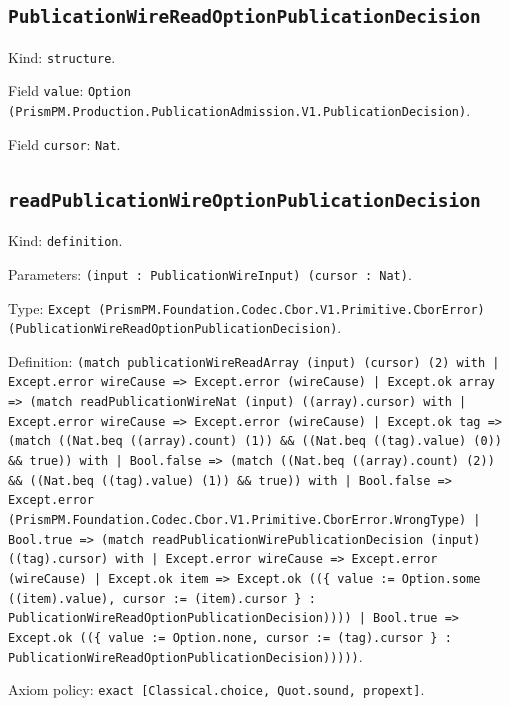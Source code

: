 \documentclass[11pt]{article}
\begin{document}
\subsection*{\texttt{PublicationWireReadOptionPublicationDecision}}
\noindent Kind: \texttt{structure}.\par
\noindent Field \texttt{value}: \texttt{Option (PrismPM.Production.PublicationAdmission.V1.PublicationDecision)}.\par
\noindent Field \texttt{cursor}: \texttt{Nat}.\par
\subsection*{\texttt{readPublicationWireOptionPublicationDecision}}
\noindent Kind: \texttt{definition}.\par
\noindent Parameters: \texttt{(input : PublicationWireInput) (cursor : Nat)}.\par
\noindent Type: \texttt{Except (PrismPM.Foundation.Codec.Cbor.V1.Primitive.CborError) (PublicationWireReadOptionPublicationDecision)}.\par
\noindent Definition: \texttt{(match publicationWireReadArray (input) (cursor) (2) with | Except.error wireCause => Except.error (wireCause) | Except.ok array => (match readPublicationWireNat (input) ((array).cursor) with | Except.error wireCause => Except.error (wireCause) | Except.ok tag => (match ((Nat.beq ((array).count) (1)) \&\& ((Nat.beq ((tag).value) (0)) \&\& true)) with | Bool.false => (match ((Nat.beq ((array).count) (2)) \&\& ((Nat.beq ((tag).value) (1)) \&\& true)) with | Bool.false => Except.error (PrismPM.Foundation.Codec.Cbor.V1.Primitive.CborError.WrongType) | Bool.true => (match readPublicationWirePublicationDecision (input) ((tag).cursor) with | Except.error wireCause => Except.error (wireCause) | Except.ok item => Except.ok ((\{ value := Option.some ((item).value), cursor := (item).cursor \} : PublicationWireReadOptionPublicationDecision)))) | Bool.true => Except.ok ((\{ value := Option.none, cursor := (tag).cursor \} : PublicationWireReadOptionPublicationDecision)))))}.\par
\noindent Axiom policy: \texttt{exact [Classical.choice, Quot.sound, propext]}.\par
\end{document}
